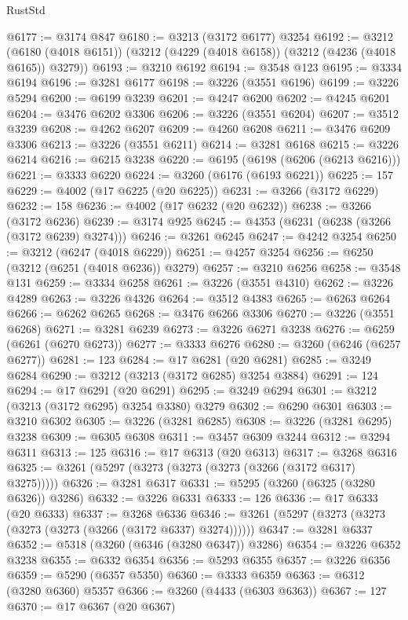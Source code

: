 \begin{lexlean}{RustStd}
\begin{coremodule}
@6177 := @3174 @847
@6180 := @3213 (@3172 @6177) @3254
@6192 := @3212
    (@6180 (@4018 @6151))
    (@3212 (@4229 (@4018 @6158)) (@3212 (@4236 (@4018 @6165)) @3279))
@6193 := @3210 @6192
@6194 := @3548 @123
@6195 := @3334 @6194
@6196 := @3281 @6177
@6198 := @3226 (@3551 @6196)
@6199 := @3226 @5294
@6200 := @6199 @3239
@6201 := @4247 @6200
@6202 := @4245 @6201
@6204 := @3476 @6202 @3306
@6206 := @3226 (@3551 @6204)
@6207 := @3512 @3239
@6208 := @4262 @6207
@6209 := @4260 @6208
@6211 := @3476 @6209 @3306
@6213 := @3226 (@3551 @6211)
@6214 := @3281 @6168
@6215 := @3226 @6214
@6216 := @6215 @3238
@6220 := @6195 (@6198 (@6206 (@6213 @6216)))
@6221 := @3333 @6220
@6224 := @3260 (@6176 (@6193 @6221))
@6225 := 157
@6229 := @4002 (@17 @6225 (@20 @6225))
@6231 := @3266 (@3172 @6229)
@6232 := 158
@6236 := @4002 (@17 @6232 (@20 @6232))
@6238 := @3266 (@3172 @6236)
@6239 := @3174 @925
@6245 := @4353 (@6231 (@6238 (@3266 (@3172 @6239) @3274)))
@6246 := @3261 @6245
@6247 := @4242 @3254
@6250 := @3212 (@6247 (@4018 @6229))
@6251 := @4257 @3254
@6256 := @6250 (@3212 (@6251 (@4018 @6236)) @3279)
@6257 := @3210 @6256
@6258 := @3548 @131
@6259 := @3334 @6258
@6261 := @3226 (@3551 @4310)
@6262 := @3226 @4289
@6263 := @3226 @4326
@6264 := @3512 @4383
@6265 := @6263 @6264
@6266 := @6262 @6265
@6268 := @3476 @6266 @3306
@6270 := @3226 (@3551 @6268)
@6271 := @3281 @6239
@6273 := @3226 @6271 @3238
@6276 := @6259 (@6261 (@6270 @6273))
@6277 := @3333 @6276
@6280 := @3260 (@6246 (@6257 @6277))
@6281 := 123
@6284 := @17 @6281 (@20 @6281)
@6285 := @3249 @6284
@6290 := @3212 (@3213 (@3172 @6285) @3254 @3884)
@6291 := 124
@6294 := @17 @6291 (@20 @6291)
@6295 := @3249 @6294
@6301 := @3212 (@3213 (@3172 @6295) @3254 @3380) @3279
@6302 := @6290 @6301
@6303 := @3210 @6302
@6305 := @3226 (@3281 @6285)
@6308 := @3226 (@3281 @6295) @3238
@6309 := @6305 @6308
@6311 := @3457 @6309 @3244
@6312 := @3294 @6311
@6313 := 125
@6316 := @17 @6313 (@20 @6313)
@6317 := @3268 @6316
@6325 := @3261 (@5297 (@3273 (@3273 (@3273 (@3266 (@3172 @6317) @3275)))))
@6326 := @3281 @6317
@6331 := @5295 (@3260 (@6325 (@3280 @6326)) @3286)
@6332 := @3226 @6331
@6333 := 126
@6336 := @17 @6333 (@20 @6333)
@6337 := @3268 @6336
@6346 := @3261 (@5297 (@3273 (@3273 (@3273 (@3273 (@3266 (@3172 @6337) @3274))))))
@6347 := @3281 @6337
@6352 := @5318 (@3260 (@6346 (@3280 @6347)) @3286)
@6354 := @3226 @6352 @3238
@6355 := @6332 @6354
@6356 := @5293 @6355
@6357 := @3226 @6356
@6359 := @5290 (@6357 @5350)
@6360 := @3333 @6359
@6363 := @6312 (@3280 @6360) @5357
@6366 := @3260 (@4433 (@6303 @6363))
@6367 := 127
@6370 := @17 @6367 (@20 @6367)

\end{coremodule}
\end{lexlean}
